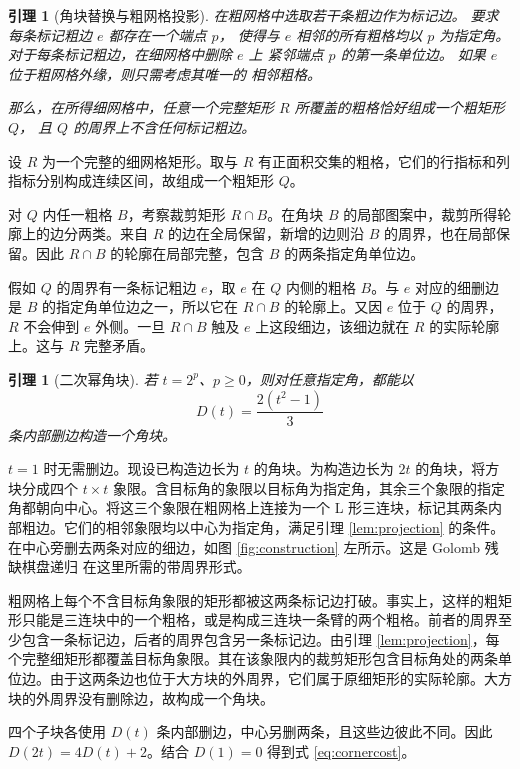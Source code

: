 \documentclass[UTF8,11pt,a4paper,fontset=none]{ctexart}
\makeatletter
\theoremstyle{plain}
\newtheorem{lemma}[theorem]{引理}
\theoremstyle{definition}
\renewcommand{\proofname}{证明}
\renewenvironment{proof}[1][\proofname]{\par
  \pushQED{\qed}%
  \normalfont
  \topsep6\p@\@plus6\p@\relax
  \trivlist
  \item[\hskip\labelsep
        \bfseries#1\@addpunct{.}]%
  \ignorespaces
}{%
  \popQED\endtrivlist\@endpefalse
}
\makeatother
\begin{document}
\begin{lemma}[角块替换与粗网格投影]


在粗网格中选取若干条粗边作为标记边。
要求每条标记粗边 $e$ 都存在一个端点 $p$，
使得与 $e$ 相邻的所有粗格均以 $p$ 为指定角。
对于每条标记粗边，在细网格中删除 $e$ 上
紧邻端点 $p$ 的第一条单位边。
如果 $e$ 位于粗网格外缘，则只需考虑其唯一的
相邻粗格。

那么，在所得细网格中，任意一个完整矩形 $R$
所覆盖的粗格恰好组成一个粗矩形 $Q$，
且 $Q$ 的周界上不含任何标记粗边。
\end{lemma}

\begin{proof}
设 \(R\) 为一个完整的细网格矩形。取与 \(R\) 有正面积交集的粗格，它们的行指标和列指标分别构成连续区间，故组成一个粗矩形 \(Q\)。

对 \(Q\) 内任一粗格 \(B\)，考察裁剪矩形 \(R\cap B\)。在角块 \(B\) 的局部图案中，裁剪所得轮廓上的边分两类。来自 \(R\) 的边在全局保留，新增的边则沿 \(B\) 的周界，也在局部保留。因此 \(R\cap B\) 的轮廓在局部完整，包含 \(B\) 的两条指定角单位边。

假如 \(Q\) 的周界有一条标记粗边 \(e\)，取 \(e\) 在 \(Q\) 内侧的粗格 \(B\)。与 \(e\) 对应的细删边是 \(B\) 的指定角单位边之一，所以它在 \(R\cap B\) 的轮廓上。又因 \(e\) 位于 \(Q\) 的周界，\(R\) 不会伸到 \(e\) 外侧。一旦 \(R\cap B\) 触及 \(e\) 上这段细边，该细边就在 \(R\) 的实际轮廓上。这与 \(R\) 完整矛盾。
\end{proof}

\begin{lemma}[二次幂角块]\label{lem:corner}
若 \(t=2^p\)、\(p\ge0\)，则对任意指定角，都能以
\begin{equation}\label{eq:cornercost}
  D(t)=\frac{2(t^2-1)}3
\end{equation}
条内部删边构造一个角块。
\end{lemma}

\begin{proof}
\(t=1\) 时无需删边。现设已构造边长为 \(t\) 的角块。为构造边长为 \(2t\) 的角块，将方块分成四个 \(t\times t\) 象限。含目标角的象限以目标角为指定角，其余三个象限的指定角都朝向中心。将这三个象限在粗网格上连接为一个 L 形三连块，标记其两条内部粗边。它们的相邻象限均以中心为指定角，满足引理 \ref{lem:projection} 的条件。在中心旁删去两条对应的细边，如图 \ref{fig:construction} 左所示。这是 Golomb 残缺棋盘递归 \cite{golomb} 在这里所需的带周界形式。

粗网格上每个不含目标角象限的矩形都被这两条标记边打破。事实上，这样的粗矩形只能是三连块中的一个粗格，或是构成三连块一条臂的两个粗格。前者的周界至少包含一条标记边，后者的周界包含另一条标记边。由引理 \ref{lem:projection}，每个完整细矩形都覆盖目标角象限。其在该象限内的裁剪矩形包含目标角处的两条单位边。由于这两条边也位于大方块的外周界，它们属于原细矩形的实际轮廓。大方块的外周界没有删除边，故构成一个角块。

四个子块各使用 \(D(t)\) 条内部删边，中心另删两条，且这些边彼此不同。因此 \(D(2t)=4D(t)+2\)。结合 \(D(1)=0\) 得到式 \eqref{eq:cornercost}。
\end{proof}
\end{document}
